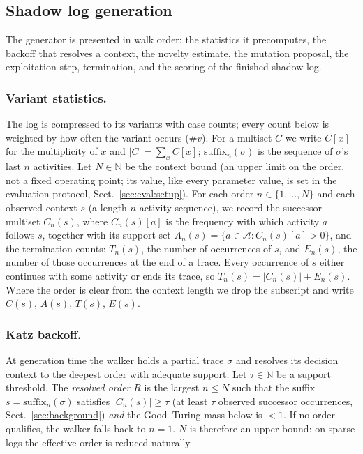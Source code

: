 \documentclass[runningheads]{llncs}
\begin{document}
\subsection{Shadow log generation}
\label{sec:method:gen}
The generator is presented in walk order: the statistics it precomputes, the backoff that resolves a context, the novelty estimate, the mutation proposal, the exploitation step, termination, and the scoring of the finished shadow log.

\subsubsection{Variant statistics.}
The log is compressed to its variants with case counts; every count below is weighted by how often the variant occurs ($\#v$). For a multiset $C$ we write $C[x]$ for the multiplicity of $x$ and $|C|=\sum_x C[x]$; $\mathrm{suffix}_n(\sigma)$ is the sequence of $\sigma$'s last $n$ activities. Let $N\in\mathbb{N}$ be the context bound (an upper limit on the order, not a fixed operating point; its value, like every parameter value, is set in the evaluation protocol, Sect.~\ref{sec:eval:setup}). For each order $n\in\{1,\dots,N\}$ and each observed context $s$ (a length-$n$ activity sequence), we record the successor multiset $C_n(s)$, where $C_n(s)[a]$ is the frequency with which activity $a$ follows $s$, together with its support set $A_n(s)=\{a\in\mathcal{A}:C_n(s)[a]>0\}$, and the termination counts: $T_n(s)$, the number of occurrences of $s$, and $E_n(s)$, the number of those occurrences at the end of a trace. Every occurrence of $s$ either continues with some activity or ends its trace, so $T_n(s)=|C_n(s)|+E_n(s)$. Where the order is clear from the context length we drop the subscript and write $C(s)$, $A(s)$, $T(s)$, $E(s)$.

\subsubsection{Katz backoff.}
At generation time the walker holds a partial trace $\sigma$ and resolves its decision context to the deepest order with adequate support. Let $\tau\in\mathbb{N}$ be a support threshold. The \emph{resolved order} $R$ is the largest $n\le N$ such that the suffix $s=\mathrm{suffix}_n(\sigma)$ satisfies $|C_n(s)|\ge\tau$ (at least $\tau$ observed successor occurrences, Sect.~\ref{sec:background}) \emph{and} the Good--Turing mass below is $<1$. If no order qualifies, the walker falls back to $n{=}1$. $N$ is therefore an upper bound: on sparse logs the effective order is reduced naturally.
\end{document}
